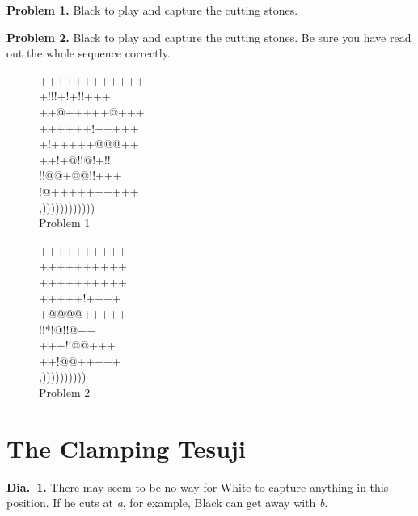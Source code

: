 \documentclass[mcrownvopaper,10pt,oneside,onecolumn,draft,showtrims]{memoir}
\begin{document}
\noindent
\textbf{Problem 1.} Black to play and capture the cutting stones.

\noindent
\textbf{Problem 2.} Black to play and capture the cutting stones. Be sure you
have read out the whole sequence correctly.

\begin{figure}[ht]
    \begin{minipage}[c]{0.57\linewidth}
        \centering    
        {\gnos%
        ++++++++++++\\
        +!!!+!+!!+++\\
        ++@+++++@+++\\
        ++++++!+++++\\
        +!+++++@@@++\\
        ++!+@!!@!+!!\\
        !!@@+@@!!+++\\
        !@++++++++++\\
        ,))))))))))))\\
        }
        Problem 1
    \end{minipage}%
    \begin{minipage}[c]{0.43\linewidth}
        \centering    
        {\gnos%
        ++++++++++\\
        ++++++++++\\
        ++++++++++\\
        +++++!++++\\
        +@@@@+++++\\
        !!*!@!!@++\\
        +++!!@@+++\\
        ++!@@+++++\\
        ,))))))))))\\
        }
        Problem 2
    \end{minipage}
\end{figure}

\section{The Clamping Tesuji}
\textbf{Dia.\ 1.} There may seem to be no way for White to capture anything in
this position. If he cuts at \textit{a}, for example, Black can get away with \textit{b}.
\end{document}
